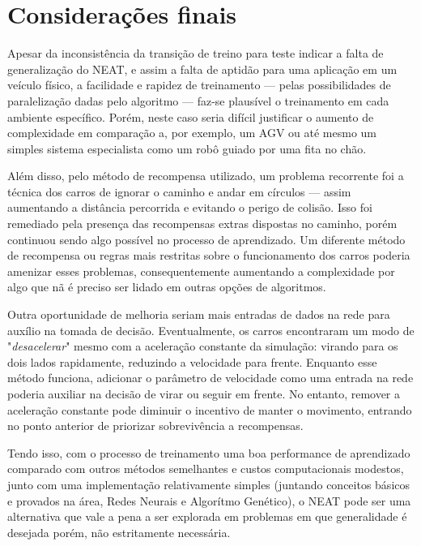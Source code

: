 \chapter{Considerações finais}

Apesar da inconsist{\^e}ncia da transi{\c
c}{\~a}o de treino para teste indicar a falta de
generaliza{\c c}{\~a}o do NEAT, e assim a falta
de aptid{\~a}o para uma aplica{\c c}{\~a}o em um
ve{\'i}culo f{\'i}sico, a facilidade e rapidez
de treinamento — pelas possibilidades de
paraleliza{\c c}{\~a}o dadas pelo algoritmo — faz-se 
plaus{\'i}vel o treinamento em cada
ambiente espec{\'i}fico. Por{\'e}m, neste caso
seria dif{\'i}cil justificar o aumento de
complexidade em compara{\c c}{\~a}o a, por
exemplo, um AGV ou at{\'e} mesmo um simples
sistema especialista como um rob{\^o} guiado
por uma fita no ch{\~a}o.

Al{\'e}m disso, pelo método de recompensa utilizado, 
um problema recorrente foi a t{\'e}cnica dos carros de 
ignorar o caminho e andar em c{\'i}rculos — assim aumentando 
a dist{\^a}ncia percorrida e evitando o perigo de colis{\~a}o. 
Isso foi remediado pela presen{\c c}a das recompensas extras 
dispostas no caminho, por{\'e}m continuou sendo algo poss{\'i}vel no 
processo de aprendizado. Um diferente m{\'e}todo de recompensa ou 
regras mais restritas sobre o funcionamento dos carros poderia 
amenizar esses problemas, consequentemente aumentando a complexidade 
por algo que n{\~a} {\'e} preciso ser lidado em outras op{\c c}{\~o}es de algoritmos.

Outra oportunidade de melhoria seriam mais entradas de dados na 
rede para aux{\'i}lio na tomada de decis{\~a}o. Eventualmente, os 
carros encontraram um modo de "\textit{desacelerar}" mesmo com a 
acelera{\c c}{\~a}o constante da simula{\c c}{\~a}o: virando para 
os dois lados rapidamente, reduzindo a velocidade para frente. 
Enquanto esse m{\'e}todo funciona, adicionar o par{\^a}metro 
de velocidade como uma entrada na rede poderia auxiliar na decis{\~a}o 
de virar ou seguir em frente. No entanto, remover a acelera{\c c}{\~a}o 
constante pode diminuir o incentivo de manter o movimento, 
entrando no ponto anterior de priorizar sobreviv{\^e}ncia a recompensas.

Tendo isso, com o processo de treinamento uma boa
performance de aprendizado comparado com outros
m{\'e}todos semelhantes e custos computacionais 
modestos, junto com uma implementa{\c c}{\~a}o 
relativamente simples (juntando conceitos
básicos e provados na {\'a}rea, Redes Neurais e
Algor{\'i}tmo Gen{\'e}tico), o NEAT pode ser uma
alternativa que vale a pena a ser explorada em
problemas em que generalidade {\'e} desejada
por{\'e}m, n{\~a}o estritamente necess{\'a}ria.
